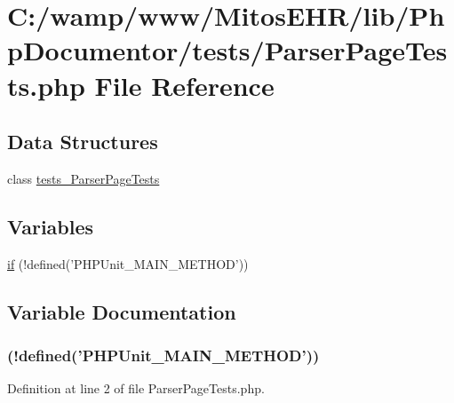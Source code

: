 \hypertarget{_parser_page_tests_8php}{\section{\-C\-:/wamp/www/\-Mitos\-E\-H\-R/lib/\-Php\-Documentor/tests/\-Parser\-Page\-Tests.php \-File \-Reference}
\label{_parser_page_tests_8php}
}
\subsection*{\-Data \-Structures}
\begin{DoxyCompactItemize}
\item 
class \hyperlink{classtests___parser_page_tests}{tests\-\_\-\-Parser\-Page\-Tests}
\end{DoxyCompactItemize}
\subsection*{\-Variables}
\begin{DoxyCompactItemize}
\item 
\hyperlink{_parser_page_tests_8php_a3120764b3588ecfc55f4be599e83d6f9}{if} (!defined('\-P\-H\-P\-Unit\-\_\-\-M\-A\-I\-N\-\_\-\-M\-E\-T\-H\-O\-D'))
\end{DoxyCompactItemize}


\subsection{\-Variable \-Documentation}
\hypertarget{_parser_page_tests_8php_a3120764b3588ecfc55f4be599e83d6f9}{
\subsubsection[{if}]{(!defined('\-P\-H\-P\-Unit\-\_\-\-M\-A\-I\-N\-\_\-\-M\-E\-T\-H\-O\-D'))}}\label{_parser_page_tests_8php_a3120764b3588ecfc55f4be599e83d6f9}


\-Definition at line 2 of file \-Parser\-Page\-Tests.\-php.

